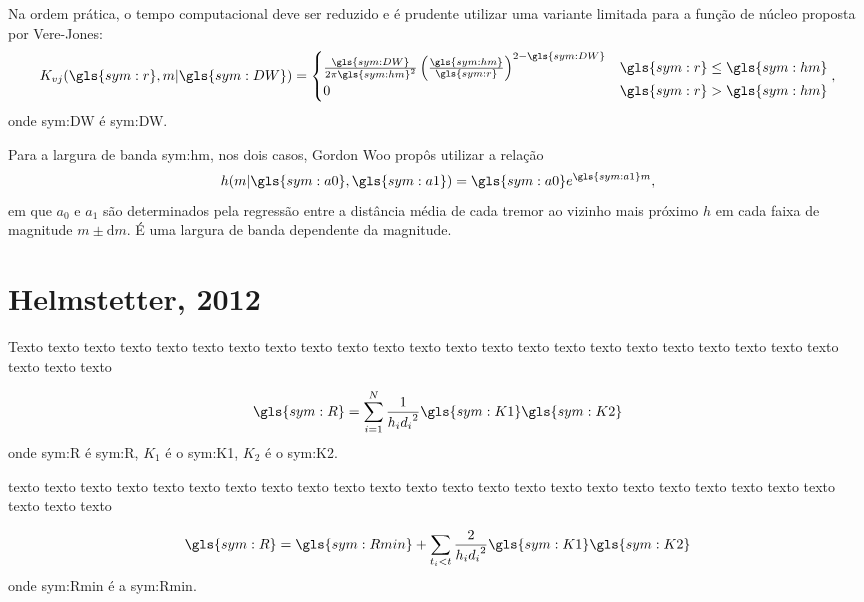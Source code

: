 Na ordem prática, o tempo computacional deve ser reduzido e é prudente utilizar uma
variante limitada para a função de núcleo proposta por Vere-Jones:\begin{equation}
	\ensuremath{
		K_{vj}(\gls{sym:r}, m \arrowvert \gls{sym:DW}) = 
		\begin{cases}
			\frac{\gls{sym:DW}}{2\pi \gls{sym:hm}^2} 
			\left( \frac{\gls{sym:hm}}{\gls{sym:r}} \right)^{2 - \gls{sym:DW}} 
			  & \gls{sym:r} \leq \gls{sym:hm} \\
			0 & \gls{sym:r} > \gls{sym:hm}
		\end{cases},
	}
	\label{eq:krm2}
\end{equation}
onde \gls{sym:DW} é \glsdesc{sym:DW}.

Para a largura de banda \gls{sym:hm}, nos dois casos, Gordon Woo propôs utilizar a relação
\begin{equation}
	\ensuremath{
		h(m\arrowvert \gls{sym:a0}, \gls{sym:a1}) = \gls{sym:a0}e^{\gls{sym:a1}m},
	}
	\label{eq:krm2}
\end{equation}
em que $a_0$ e $a_1$ são determinados pela regressão entre a 
distância média de cada tremor ao vizinho mais próximo $h$ em cada faixa de magnitude $m \pm \mathrm{d}m$.
É uma largura de banda dependente da magnitude.


\section{Helmstetter, 2012}
\label{sec:helmstetter}

Texto texto texto texto texto texto texto texto texto texto texto texto texto
texto texto texto texto texto texto texto texto texto texto texto texto texto

\begin{equation}
	\ensuremath{\gls{sym:R} = \sum_{i=1}^{N}{ \frac{1}{h_i {d_i}^2} \gls{sym:K1}\gls{sym:K2} }}
	\label{eq:helms01}
\end{equation}
onde \gls{sym:R} é \glsdesc{sym:R}, 
	  $K_1$ é o \glsdesc{sym:K1}, 
	  $K_2$ é o \glsdesc{sym:K2}.


texto texto texto texto texto texto texto texto texto texto texto texto texto
texto texto texto texto texto texto texto texto texto texto texto texto texto

\begin{equation}
\ensuremath{\gls{sym:R} = \gls{sym:Rmin} + \sum_{t_i < t}{ \frac{2}{h_i {d_i}^2} \gls{sym:K1}\gls{sym:K2} }}
	\label{eq:helms02}
\end{equation}
onde \gls{sym:Rmin} é a \glsdesc{sym:Rmin}.

